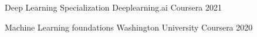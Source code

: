 

\begin{cvhonors}

    


%     
    


            \cvhonor
        {Deep Learning Specialization} %
        {Deeplearning.ai Coursera} %
    {} %
    {2021} %
%     
    
     \cvhonor
        {Machine Learning foundations} %
  {Washington University Coursera} %
    {} %
    {2020} %
  

\end{cvhonors}